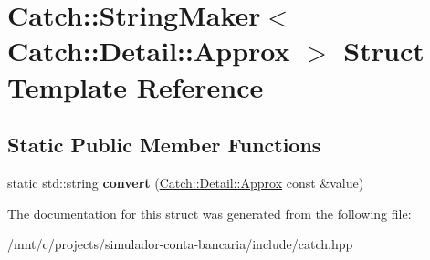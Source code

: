 \hypertarget{structCatch_1_1StringMaker_3_01Catch_1_1Detail_1_1Approx_01_4}{}\section{Catch\+:\+:String\+Maker$<$ Catch\+:\+:Detail\+:\+:Approx $>$ Struct Template Reference}
\label{structCatch_1_1StringMaker_3_01Catch_1_1Detail_1_1Approx_01_4}
\subsection*{Static Public Member Functions}
\begin{DoxyCompactItemize}
\item 
\mbox{\label{structCatch_1_1StringMaker_3_01Catch_1_1Detail_1_1Approx_01_4_a8e5015720682fecfbff0f05de19a698f}} 
static std\+::string {\bfseries convert} (\hyperlink{classCatch_1_1Detail_1_1Approx}{Catch\+::\+Detail\+::\+Approx} const \&value)
\end{DoxyCompactItemize}


The documentation for this struct was generated from the following file\+:\begin{DoxyCompactItemize}
\item 
/mnt/c/projects/simulador-\/conta-\/bancaria/include/catch.\+hpp\end{DoxyCompactItemize}
